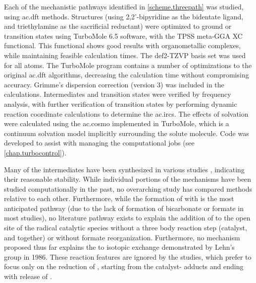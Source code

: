 Each of the mechanistic pathways identified in \autoref{scheme.threepath} was studied, using \gls{ac.dft} methods. Structures (using 2,2'-bipyridine as the bidentate ligand, and triethylamine as the sacrificial reductant) were optimized to ground or transition states using TurboMole 6.5 software\autocite{turbomole, ahlrichs1989}, with the TPSS meta-GGA XC functional\autocite{tao2003}. This functional shows good results with organometallic complexes, while maintaining feasible calculation times. The def2-TZVP basis set was used for all atoms\autocite{schafer1994, weigend2005}. The TurboMole program contains a number of optimizations to the original \gls{ac.dft} algorithms\autocite{haase1993, treutler1995, eichkorn1997, eichkorn1995, sierka2003, deglmann2004, weigend2002, vonarnim1998, ahlrichs2004}, decreasing the calculation time without compromising accuracy. Grimme's dispersion correction (version 3) was included in the calculations\autocite{grimme2010}. Intermediates and transition states were verified by frequency analysis\autocite{deglmann2004, deglmann2002, grimme2002}, with further verification of transition states by performing dynamic reaction coordinate calculations to determine the \glspl{ac.irc}. The effects of solvation were calculated using the \gls{ac.cosmo} implemented in TurboMole\autocite{klamt1993}, which is a continuum solvation model implicitly surrounding the solute molecule. Code was developed to assist with managing the computational jobs (see \autoref{chap.turbocontrol}).

Many of the intermediates have been synthesized in various studies \autocite{shaver1992, gibson1998, gibson1999, gibson2003}, indicating their reasonable stability. While individual portions of the mechanisms have been studied computationally in the past\autocite{agarwal2011, agarwal2012a, agarwal2012b}, no overarching study has compared methods relative to each other. Furthermore, while the formation of  with  is the most anticipated pathway (due to the lack of formation of bicarbonate or formate in most studies), no literature pathway exists to explain the addition of  to the open site of the radical catalytic species without a three body reaction step (catalyst,  and  together) or without formate reorganization. Furthermore, no mechanism proposed thus far explains the  to  isotopic exchange demonstrated by Lehn's group in 1986\autocite{hawecker1986}. These reaction features are ignored by the studies, which prefer to focus only on the reduction of , starting from the catalyst- adducts and ending with release of .

